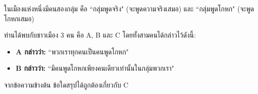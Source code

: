 ﻿%
\question ในเมืองแห่งหนึ่งมีคนสองกลุ่ม คือ ``กลุ่มพูดจริง" (จะพูดความจริงเสมอ) และ ``กลุ่มพูดโกหก" (จะพูดโกหกเสมอ) 

ท่านได้พบกับชาวเมือง 3 คน คือ A, B และ C โดยทั้งสามคนได้กล่าวไว้ดังนี้:
\begin{itemize}
    \item \textbf{A กล่าวว่า:} ``พวกเราทุกคนเป็นคนพูดโกหก"
    \item \textbf{B กล่าวว่า:} ``มีคนพูดโกหกเพียงคนเดียวเท่านั้นในกลุ่มพวกเรา"
\end{itemize}
จากข้อความข้างต้น ข้อใดสรุปได้ถูกต้องเกี่ยวกับ C
\newline 
{}

